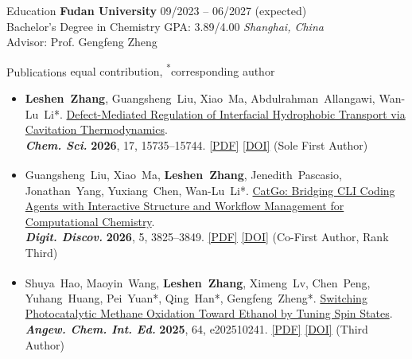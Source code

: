 \documentclass{resume} %
\newcommand{\me}{\textbf{\setbox0\hbox{Leshen Zhang}\rlap{\rule[-2.4pt]{\wd0}{0.9pt}}\box0}} %
\newcommand{\eq}{\textsuperscript{\textdaggerdbl}}
\newcommand{\ptitle}[1]{#1} %
\newcommand{\bluehref}[2]{{\hypersetup{urlcolor=blue}\href{#1}{#2}}} %
\begin{document}
\raggedright{} %

\begin{rSection}{Education}
{\bf Fudan University} \hfill 09/2023 -- 06/2027 (expected) \\
Bachelor's Degree in Chemistry \textbar{} GPA: 3.89/4.00 \hfill \textit{Shanghai, China} \\
Advisor: Prof. Gengfeng Zheng
\end{rSection}

\begin{rSection}{Publications \hfill {\normalfont\footnotesize \textsuperscript{\textdaggerdbl}equal contribution, \textsuperscript{*}corresponding author}}
{\small\begin{itemize}[leftmargin=2.6em,labelsep=0.4em,itemsep=1pt]
  \item[\textbf{[J.1]}] \hypertarget{J.1}{}\me, Guangsheng~Liu, Xiao~Ma, Abdulrahman~Allangawi, Wan-Lu~Li*. \href{https://doi.org/10.1039/D6SC02460B}{\ptitle{Defect-Mediated Regulation of Interfacial Hydrophobic Transport via Cavitation Thermodynamics}}. \\ \textbf{\textit{Chem. Sci.}} \textbf{2026}, 17, 15735--15744. \bluehref{https://leshenzhang.github.io/papers/J1_Zhang2026_ChemSci.pdf}{[PDF]} \bluehref{https://doi.org/10.1039/D6SC02460B}{[DOI]} (Sole First Author)
  \item[\textbf{[J.2]}] \hypertarget{J.2}{}Guangsheng~Liu\eq, Xiao~Ma\eq, \me\eq, Jenedith~Pascasio, Jonathan~Yang, Yuxiang~Chen, Wan-Lu~Li*. \href{https://doi.org/10.1039/D6DD00273K}{\ptitle{CatGo: Bridging CLI Coding Agents with Interactive Structure and Workflow Management for Computational Chemistry}}. \\ \textbf{\textit{Digit. Discov.}} \textbf{2026}, 5, 3825--3849. \bluehref{https://leshenzhang.github.io/papers/J2_Liu2026_DigitDiscov.pdf}{[PDF]} \bluehref{https://doi.org/10.1039/D6DD00273K}{[DOI]} (Co-First Author, Rank Third)
  \item[\textbf{[J.3]}] \hypertarget{J.3}{}Shuya~Hao\eq, Maoyin~Wang\eq, \me, Ximeng~Lv, Chen~Peng, Yuhang~Huang, Pei~Yuan*, Qing~Han*, Gengfeng~Zheng*. \href{https://doi.org/10.1002/anie.202510241}{\ptitle{Switching Photocatalytic Methane Oxidation Toward Ethanol by Tuning Spin States}}. \\ \textbf{\textit{Angew. Chem. Int. Ed.}} \textbf{2025}, 64, e202510241. \bluehref{https://leshenzhang.github.io/papers/J3_Hao2025_AngewChem.pdf}{[PDF]} \bluehref{https://doi.org/10.1002/anie.202510241}{[DOI]} (Third Author)
\end{itemize}}
\end{rSection}
\end{document}
